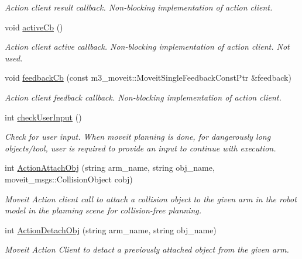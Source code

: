 \begin{DoxyCompactItemize}
\begin{DoxyCompactList}\small\item\em Action client result callback. Non-\/blocking implementation of action client. \end{DoxyCompactList}\item 
\mbox{\label{structManipulate_abccb09b1132e0896d6f3825e166fd241}} 
void \hyperlink{structManipulate_abccb09b1132e0896d6f3825e166fd241}{active\+Cb} ()
\begin{DoxyCompactList}\small\item\em Action client active callback. Non-\/blocking implementation of action client. Not used. \end{DoxyCompactList}\item 
void \hyperlink{structManipulate_aea788f083af31cad6f9519ffa5903d58}{feedback\+Cb} (const m3\+\_\+moveit\+::\+Moveit\+Single\+Feedback\+Const\+Ptr \&feedback)
\begin{DoxyCompactList}\small\item\em Action client feedback callback. Non-\/blocking implementation of action client. \end{DoxyCompactList}\item 
int \hyperlink{structManipulate_a581e8cd0fc68f7191da0a46bc888d5c6}{check\+User\+Input} ()
\begin{DoxyCompactList}\small\item\em Check for user input. When moveit planning is done, for dangerously long objects/tool, user is required to provide an input to continue with execution. \end{DoxyCompactList}\item 
int \hyperlink{structManipulate_a078e4f4dd5e337e937fb502d8b8d4fc9}{Action\+Attach\+Obj} (string arm\+\_\+name, string obj\+\_\+name, moveit\+\_\+msgs\+::\+Collision\+Object cobj)
\begin{DoxyCompactList}\small\item\em Moveit Action client call to attach a collision object to the given arm in the robot model in the planning scene for collision-\/free planning. \end{DoxyCompactList}\item 
int \hyperlink{structManipulate_ac90a0b245db67e17d0b11692b200c531}{Action\+Detach\+Obj} (string arm\+\_\+name, string obj\+\_\+name)
\begin{DoxyCompactList}\small\item\em Moveit Action Client to detact a previously attached object from the given arm. \end{DoxyCompactList}\item 

\end{DoxyCompactItemize}
